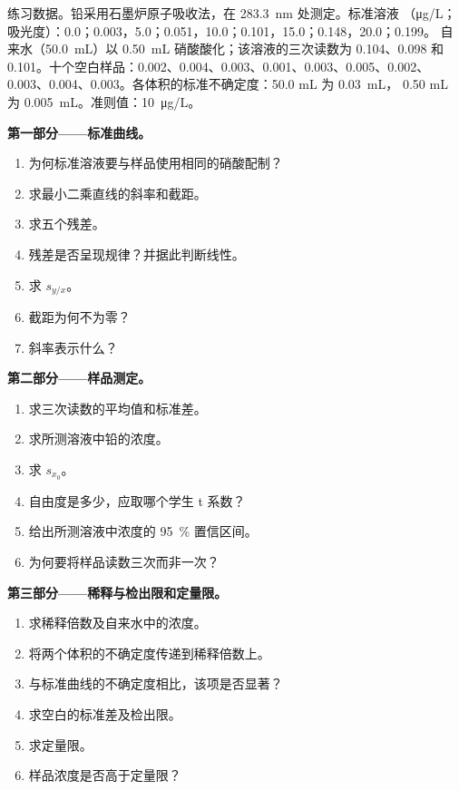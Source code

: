 \begin{problem}
\label{pb:b2:measurement-statistics:1}
练习数据。铅采用石墨炉原子吸收法，在 \qty{283.3}{nm} 处测定。标准溶液
（\unit{\micro g/L}；吸光度）：0.0；0.003，5.0；0.051，10.0；0.101，15.0；0.148，20.0；0.199。
自来水（\qty{50.0}{mL}）以 \qty{0.50}{mL} 硝酸酸化；该溶液的三次读数为
0.104、0.098 和 0.101。十个空白样品：0.002、0.004、0.003、0.001、0.003、0.005、0.002、
0.003、0.004、0.003。各体积的标准不确定度：50.0 mL 为 \qty{0.03}{mL}，
0.50 mL 为 \qty{0.005}{mL}。准则值：\qty{10}{\micro g/L}。

\medskip
\noindent\textbf{第一部分——标准曲线。}
\begin{enumerate}
  \item 为何标准溶液要与样品使用相同的硝酸配制？
  \item 求最小二乘直线的斜率和截距。
  \item 求五个残差。
  \item 残差是否呈现规律？并据此判断线性。
  \item 求 $s_{y/x}$。
  \item 截距为何不为零？
  \item 斜率表示什么？
\end{enumerate}

\medskip
\noindent\textbf{第二部分——样品测定。}
\begin{enumerate}[resume]
  \item 求三次读数的平均值和标准差。
  \item 求所测溶液中铅的浓度。
  \item 求 $s_{x_0}$。
  \item 自由度是多少，应取哪个学生 t 系数？
  \item 给出所测溶液中浓度的 95~\% 置信区间。
  \item 为何要将样品读数三次而非一次？
\end{enumerate}

\medskip
\noindent\textbf{第三部分——稀释与检出限和定量限。}
\begin{enumerate}[resume]
  \item 求稀释倍数及自来水中的浓度。
  \item 将两个体积的不确定度传递到稀释倍数上。
  \item 与标准曲线的不确定度相比，该项是否显著？
  \item 求空白的标准差及检出限。
  \item 求定量限。
  \item 样品浓度是否高于定量限？
\end{enumerate}


\end{problem}
